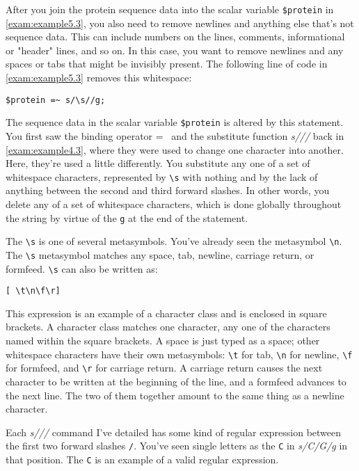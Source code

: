After you join the protein sequence data into the scalar variable \verb|$protein| in \autoref{exam:example5.3}, you also need to remove newlines and anything else that's not sequence data. This can include numbers on the lines, comments, informational or "header" lines, and so on. In this case, you want to remove newlines and any spaces or tabs that might be invisibly present. The following line of code in \autoref{exam:example5.3} removes this whitespace:

\begin{lstlisting}
$protein =~ s/\s//g;
\end{lstlisting}

The sequence data in the scalar variable \verb|$protein| is altered by this statement. You first saw the binding operator =~ and the substitute function \textit{s///} back in \autoref{exam:example4.3}, where they were used to change one character into another. Here, they're used a little differently. You substitute any one of a set of whitespace characters, represented by \verb|\s| with nothing and by the lack of anything between the second and third forward slashes. In other words, you delete any of a set of whitespace characters, which is done globally throughout the string by virtue of the \verb|g| at the end of the statement.

The \verb|\s| is one of several metasymbols. You've already seen the metasymbol \verb|\n|. The \verb|\s| metasymbol matches any space, tab, newline, carriage return, or formfeed. \verb|\s| can also be written as: 

\begin{lstlisting}
[ \t\n\f\r]
\end{lstlisting}

This expression is an example of a character class and is enclosed in square brackets. A character class matches one character, any one of the characters named within the square brackets. A space is just typed as a space; other whitespace characters have their own metasymbols: \verb|\t| for tab, \verb|\n| for newline, \verb|\f| for formfeed, and \verb|\r| for carriage return. A carriage return causes the next character to be written at the beginning of the line, and a formfeed advances to the next line. The two of them together amount to the same thing as a newline character.

Each \textit{s///} command I've detailed has some kind of regular expression between the first two forward slashes \verb|/|. You've seen single letters as the \verb|C| in \textit{s/C/G/g} in that position. The \verb|C| is an example of a valid regular expression.

